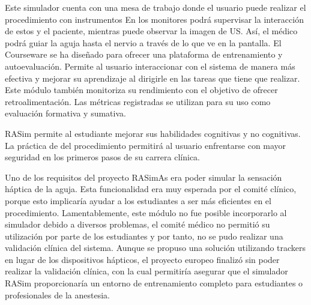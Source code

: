 Este simulador cuenta con una mesa de trabajo donde el usuario puede realizar el procedimiento con instrumentos 
En los monitores podrá supervisar la interacción de estos y el paciente, mientras puede observar la imagen de \ac{US}. Así, el médico podrá guiar la aguja hasta el nervio a través de lo que ve en la pantalla. El \ac{Courseware} se ha diseñado para ofrecer una plataforma de entrenamiento y autoevaluación. Permite al usuario interaccionar con el sistema de manera más efectiva y mejorar su aprendizaje al dirigirle en las tareas que tiene que realizar. Este módulo también monitoriza su rendimiento con el objetivo de ofrecer retroalimentación. Las métricas registradas se utilizan para su uso como evaluación formativa y sumativa. 

\ac{RASim} permite al estudiante mejorar sus habilidades cognitivas y no cognitivas. La práctica de del procedimiento permitirá al usuario enfrentarse con mayor seguridad en los primeros pasos de su carrera clínica. 



Uno de los requisitos del proyecto \ac{RASimAs} era poder simular la sensación háptica de la aguja. Esta funcionalidad era muy esperada por el comité clínico, porque esto implicaría ayudar a los estudiantes a ser más eficientes en el procedimiento. Lamentablemente, este módulo no fue posible incorporarlo al simulador debido a diversos problemas, el comité médico no permitió su utilización por parte de los estudiantes y por tanto, no se pudo realizar una validación clínica del sistema. 
%
Aunque se propuso una solución utilizando \ac{tracker}s en lugar de los dispositivos hápticos, el proyecto europeo finalizó sin poder realizar la validación clínica, con la cual permitiría asegurar que el simulador \ac{RASim} proporcionaría un entorno de entrenamiento completo para estudiantes o profesionales de la anestesia. 

